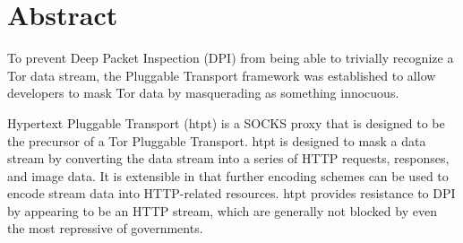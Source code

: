 \section{Abstract}
To prevent Deep Packet Inspection (DPI) from being able to trivially recognize a Tor data stream, the Pluggable Transport framework was established to allow developers to mask Tor data by masquerading as something innocuous. 

Hypertext Pluggable Transport (htpt) is a SOCKS proxy that is designed to be the precursor of a Tor Pluggable Transport. htpt is designed to mask a data stream by converting the data stream into a series of HTTP requests, responses, and image data. It is extensible in that further encoding schemes can be used to encode stream data into HTTP-related resources. htpt provides resistance to DPI by appearing to be an HTTP stream, which are generally not blocked by even the most repressive of governments. 
 
